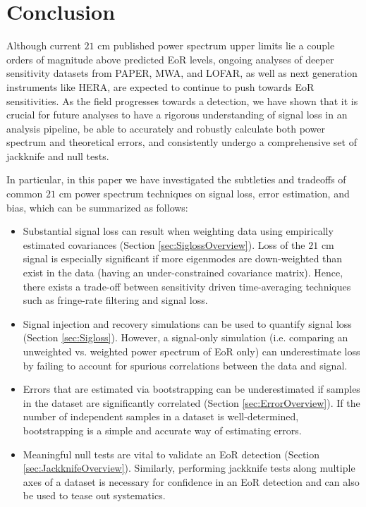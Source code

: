 \documentclass[preprint2,numberedappendix,tighten]{aastex6}  %
\begin{document}

\section{Conclusion}
\label{sec:Con}

Although current $21$ cm published power spectrum upper limits lie a couple orders of magnitude above predicted EoR levels, ongoing analyses of deeper sensitivity datasets from PAPER, MWA, and LOFAR, as well as next generation instruments like HERA, are expected to continue to push towards EoR sensitivities. As the field progresses towards a detection, we have shown that it is crucial for future analyses to have a rigorous understanding of signal loss in an analysis pipeline, be able to accurately and robustly calculate both power spectrum and theoretical errors, and consistently undergo a comprehensive set of jackknife and null tests.

In particular, in this paper we have investigated the subtleties and tradeoffs of common $21$ cm power spectrum techniques on signal loss, error estimation, and bias, which can be summarized as follows:

\begin{itemize}
\item Substantial signal loss can result when weighting data using empirically estimated covariances (Section \ref{sec:SiglossOverview}). Loss of the $21$ cm signal is especially significant if more eigenmodes are down-weighted than exist in the data (having an under-constrained covariance matrix). Hence, there exists a trade-off between sensitivity driven time-averaging techniques such as fringe-rate filtering and signal loss. 
\item Signal injection and recovery simulations can be used to quantify signal loss (Section \ref{sec:Sigloss}). However, a signal-only simulation (i.e. comparing an unweighted vs. weighted power spectrum of EoR only) can underestimate loss by failing to account for spurious correlations between the data and signal.
\item Errors that are estimated via bootstrapping can be underestimated if samples in the dataset are significantly correlated (Section \ref{sec:ErrorOverview}). If the number of independent samples in a dataset is well-determined, bootstrapping is a simple and accurate way of estimating errors.
\item Meaningful null tests are vital to validate an EoR detection (Section \ref{sec:JackknifeOverview}). Similarly, performing jackknife tests along multiple axes of a dataset is necessary for confidence in an EoR detection and can also be used to tease out systematics.
\end{itemize}
\end{document}
